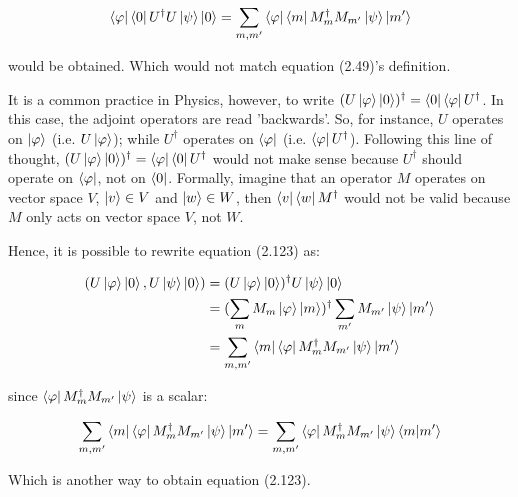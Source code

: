\[
\bra{\varphi} \bra{0} U^\dagger U \ket{\psi} \ket{0} =
\sum_{m,m'} \bra{\varphi}\bra{m} M^\dagger_m M_{m'} \ket{\psi} \ket{m'}
\]

would be obtained. Which would not match equation (2.49)'s definition.

It is a common practice in Physics, however, to write $(U\ket{\varphi} \ket{0})^\dagger = \bra{0} \bra{\varphi} U^\dagger$. In this case, the adjoint operators are read 'backwards'. So, for instance, $U$ operates on $\ket{\varphi}$ (i.e. $U\ket{\varphi}$); while $U^\dagger$ operates on $\bra{\varphi}$ (i.e. $\bra{\varphi} U^\dagger$). Following this line of thought, $(U\ket{\varphi} \ket{0})^\dagger = \bra{\varphi} \bra{0} U^\dagger$ would not make sense because $U^\dagger$ should operate on $\bra{\varphi}$, not on $\bra{0}$. Formally, imagine that an operator $M$ operates on vector space $V$, $\ket{v} \in V$ and $\ket{w} \in W$, then $\bra{v} \bra{w} M^\dagger$ would not be valid because $M$ only acts on vector space $V$, not $W$.

Hence, it is possible to rewrite equation (2.123) as:

\begin{align}
    (U \ket{\varphi} \ket{0}, U \ket{\psi} \ket{0}) &= 
    (U \ket{\varphi} \ket{0})^\dagger U \ket{\psi} \ket{0}
    \\ 
    &= (\sum_m M_m \ket{\varphi} \ket{m})^\dagger \sum_{m'} M_{m'} \ket{\psi} \ket{m'}
    \\
    &= \sum_{m, m'} \bra{m} \bra{\varphi} M_m^\dagger M_{m'} \ket{\psi} \ket{m'}
\end{align}

since $\bra{\varphi} M_m^\dagger M_{m'} \ket{\psi}$ is a scalar:

\begin{align}
    \sum_{m, m'} \bra{m} \bra{\varphi} M_m^\dagger M_{m'} \ket{\psi} \ket{m'} =
    \sum_{m, m'} \bra{\varphi} M_m^\dagger M_{m'} \ket{\psi} \mathop{\mathinner{ \langle{m}|{m'}\rangle}}
\end{align}

Which is another way to obtain equation (2.123).
